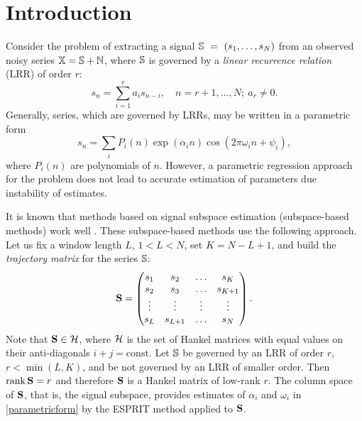 \documentclass[sii]{ipart}
\def\rank{\mathop{\mathrm{rank}}}
\begin{document}
\begin{frontmatter}

\begin{keyword}
\end{keyword}


\end{frontmatter}

\section{Introduction}
Consider the problem of extracting a signal $\mathbb{S}~=~(s_1, \ldots, s_N)$ from an observed noisy series $\mathbb{X} = \mathbb{S} + \mathbb{N}$, where $\mathbb{S}$ is governed by a \emph{linear recurrence relation} (LRR) of order $r$:
\begin{equation*}
s_n = \sum_{i = 1}^{r} a_i s_{n-i}, \quad n = r + 1, \ldots, N;\  a_r\neq 0.
\end{equation*}
Generally, series, which are governed by LRRs, may be written in a parametric form
\begin{equation} \label{parametricform}
s_n = \sum_i P_i(n) \exp(\alpha_i n) \cos(2 \pi \omega_i n + \psi_i),
\end{equation}
where $P_i(n)$ are polynomials of $n$. However, a parametric regression approach for the problem does not lead to accurate estimation of parameters due instability of estimates.

It is known that methods based on signal subspace estimation (subspace-based methods) work well \cite{Broomhead.King1986, Vautard.etal1992, Elsner.Tsonis1996, Golyandina.etal2001}. These subspace-based methods use the following approach. Let us fix a window length $L$, $1 < L < N$, set $K = N - L + 1$, and build the \emph{trajectory matrix} for the series $\mathbb{S}$:
\begin{equation*}
\bfS = \begin{pmatrix}
s_1 & s_2 & \ldots & s_K \\
s_2 & s_3 & \ldots & s_{K + 1} \\
\vdots & \vdots & \vdots & \vdots \\
s_L & s_{L + 1} & \ldots & s_N
\end{pmatrix}.
\end{equation*}
Note that $\mathbf{S}\in \mathcal{H}$, where $\mathcal{H}$ is the set of Hankel matrices with equal values on their anti-diagonals $i+j=\mathrm{const}$.
 Let $\mathbb{S}$ be governed by an LRR of order $r$, $r < \min(L, K)$, and be not governed by an LRR of smaller order. Then $\rank \bfS = r$ and therefore $\mathbf{S}$ is a Hankel matrix of low-rank $r$. The column space of $\mathbf{S}$, that is, the  signal subspace, provides estimates of $\alpha_i$ and $\omega_i$ in \eqref{parametricform} by the ESPRIT method \cite{Roy.Kailath1989, Golyandina.Zhigljavsky2012} applied to $\mathbf{S}$.
\end{document}
